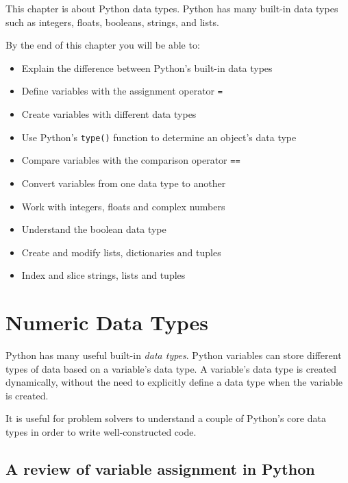 \documentclass{book}
\newcommand{\passthrough}[1]{#1}
\begin{document}
    
        This chapter is about Python data types. Python has many built-in data
types such as integers, floats, booleans, strings, and lists.

By the end of this chapter you will be able to:

\begin{itemize}
\item
  Explain the difference between Python's built-in data types
\item
  Define variables with the assignment operator
  \passthrough{\lstinline!=!}
\item
  Create variables with different data types
\item
  Use Python's \passthrough{\lstinline!type()!} function to determine an
  object's data type
\item
  Compare variables with the comparison operator
  \passthrough{\lstinline!==!}
\item
  Convert variables from one data type to another
\item
  Work with integers, floats and complex numbers
\item
  Understand the boolean data type
\item
  Create and modify lists, dictionaries and tuples
\item
  Index and slice strings, lists and tuples
\end{itemize}
        \newpage

    




    
        \hypertarget{numeric-data-types}{%
\section{Numeric Data Types}\label{numeric-data-types}}
    




    
        Python has many useful built-in \emph{data types}. Python variables can
store different types of data based on a variable's data type. A
variable's data type is created dynamically, without the need to
explicitly define a data type when the variable is created.

It is useful for problem solvers to understand a couple of Python's core
data types in order to write well-constructed code.
    




    
        \hypertarget{a-review-of-variable-assignment-in-python}{%
\subsection{A review of variable assignment in
Python}\label{a-review-of-variable-assignment-in-python}}
\end{document}
